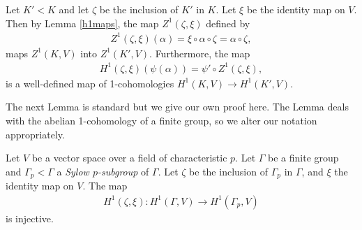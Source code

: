 \begin{example}
	Let $K' < K$ and let $\zeta$ be the inclusion of $K'$ in $K$. Let $\xi$ be the identity map on $V$. Then by Lemma \ref{h1maps}, the map $Z^1(\zeta, \xi)$ defined by
\begin{align*}
	Z^1(\zeta, \xi)(\alpha) = \xi \circ \alpha \circ \zeta = \alpha \circ \zeta,
\end{align*}
maps $Z^1(K, V)$ into $Z^1(K', V)$. Furthermore, the map
\begin{align*}
	H^1(\zeta, \xi)(\psi(\alpha)) = \psi' \circ Z^1(\zeta, \xi),
\end{align*}
is a well-defined map of 1-cohomologies $H^1(K, V) \rightarrow H^1(K', V)$.
\end{example}

The next Lemma is standard \cite[Theorem 10.3]{brown1976cohomology} but we give our own proof here. The Lemma deals with the abelian 1-cohomology of a finite group, so we alter our notation appropriately.
\begin{lemma}
Let $V$ be a vector space over a field of characteristic $p$. Let $\Gamma$ be a finite group and $\Gamma_p < \Gamma$ a \emph{Sylow $p$-subgroup} of $\Gamma$. Let $\zeta$ be the inclusion of $\Gamma_p$ in $\Gamma$, and $\xi$ the identity map on $V$. The map 
\begin{align*}
H^1(\zeta, \xi):H^1(\Gamma, V)\rightarrow H^1(\Gamma_p, V)
\end{align*}
is injective.
\label{lem:a_h_restriction}
\end{lemma}
